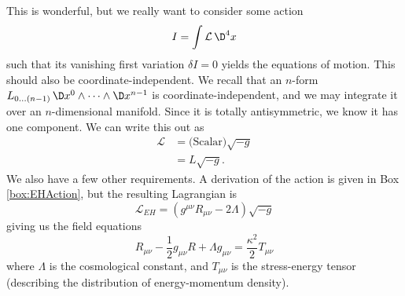 This is wonderful, but we really want to consider some action
\begin{equation}
I=\int\mathcal{L}\,\D^{4}x
\end{equation}
such that its vanishing first variation $\delta I=0$ yields the
equations of motion. This should also be
coordinate-independent. We recall that an $n$-form
$L_{0\dots(n-1)}\,\D x^{0}\wedge\dots\wedge\D x^{n-1}$ is
coordinate-independent, and we may integrate it over an
$n$-dimensional manifold. Since it is totally antisymmetric, we
know it has one component. We can write this out as
\begin{equation}
\begin{split}
\mathcal{L}&=\mbox{(Scalar)}\sqrt{-g}\\
&=L\sqrt{-g}.
\end{split}
\end{equation}
We also have a few other requirements. A derivation of the
action is given in Box \ref{box:EHAction}, but the resulting
Lagrangian is
\begin{equation}
\mathcal{L}_{EH}=(g^{\mu\nu}R_{\mu\nu}-2\Lambda)\sqrt{-g}
\end{equation}
giving us the field equations
\begin{equation}
R_{\mu\nu}-\frac{1}{2}g_{\mu\nu}R+\Lambda g_{\mu\nu}=\frac{\kappa^{2}}{2}T_{\mu\nu}
\end{equation}
where $\Lambda$ is the cosmological constant, and $T_{\mu\nu}$ is
the stress-energy tensor (describing the distribution of
energy-momentum density). 

